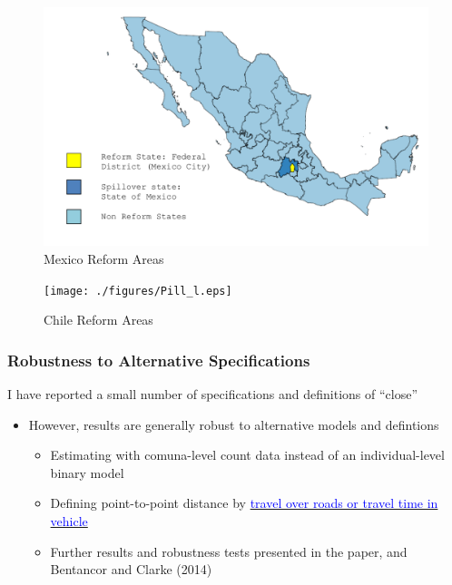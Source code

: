 \documentclass[10pt,letterpaper,subeqn]{beamer}
\begin{document}
\begin{frame}[label=MexMap]
\begin{figure}
\begin{center}
\caption{Mexico Reform Areas}
\hspace{-16mm}\includegraphics[scale=0.32]{./figures/MexReform.png}
\end{center}
\end{figure}
\end{frame}

\begin{frame}[label=ChileMap]
\begin{figure}
\begin{center}
\caption{Chile Reform Areas}
\hspace{-16mm}\texttt{[image: ./figures/Pill\_l.eps]}
\end{center}
\end{figure}
\end{frame}

\begin{frame}[label=robust]
 \frametitle{Robustness to Alternative Specifications}
I have reported a small number of specifications and definitions of ``close''
\vspace{4mm}
\begin{itemize}
\item However, results are generally robust to alternative models and defintions
\begin{itemize}
\item Estimating with comuna-level count data instead of an individual-level binary model
\item Defining point-to-point distance by \hyperlink{distance}{\textcolor{blue}{travel over roads or travel time in vehicle}}
\item Further results and robustness tests presented in the paper, and Bentancor and Clarke (2014)
\end{itemize}
\end{itemize}
\end{frame}
\end{document}
